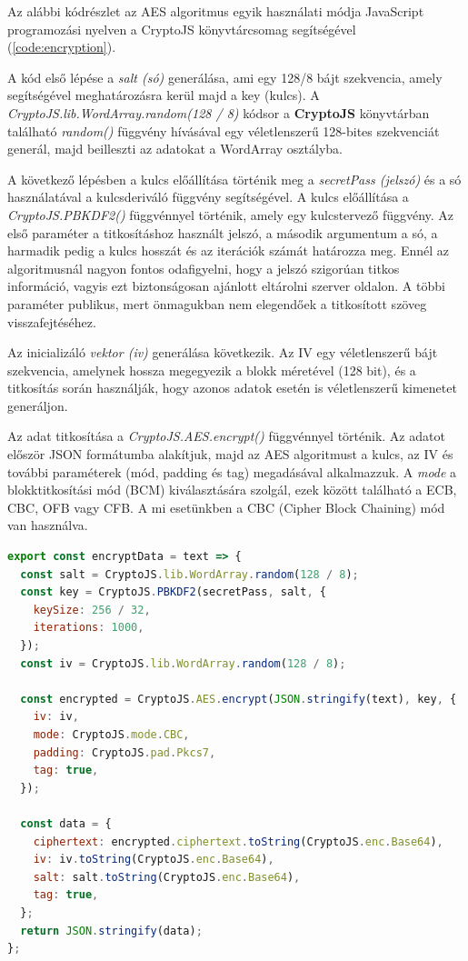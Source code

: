Az alábbi kódrészlet az AES algoritmus egyik használati módja JavaScript programozási nyelven a CryptoJS könyvtárcsomag segítségével (\ref{code:encryption}).

A kód első lépése a \textit{salt (só)} generálása, ami egy 128/8 bájt szekvencia, amely segítségével meghatározásra kerül majd a key (kulcs). A \textit{CryptoJS.lib.WordArray.random(128 / 8)} kódsor a \textbf{CryptoJS} könyvtárban található \textit{random()} függvény hívásával egy véletlenszerű 128-bites szekvenciát generál, majd beilleszti az adatokat a WordArray osztályba.

A következő lépésben a kulcs előállítása történik meg a \textit{secretPass (jelszó)} és a só használatával a kulcsderiváló függvény segítségével. A kulcs előállítása a \textit{CryptoJS.PBKDF2()} függvénnyel történik, amely egy kulcstervező függvény. Az első paraméter a titkosításhoz használt jelszó, a második argumentum a só, a harmadik pedig a kulcs hosszát és az iterációk számát határozza meg. Ennél az algoritmusnál nagyon fontos odafigyelni, hogy a jelszó szigorúan titkos információ, vagyis ezt biztonságosan ajánlott eltárolni szerver oldalon. A többi paraméter publikus, mert önmagukban nem elegendőek a titkosított szöveg visszafejtéséhez.

Az inicializáló \textit{vektor (iv)} generálása következik. Az IV egy véletlenszerű bájt szekvencia, amelynek hossza megegyezik a blokk méretével (128 bit), és a titkosítás során használják, hogy azonos adatok esetén is véletlenszerű kimenetet generáljon.

\pagebreak

Az adat titkosítása a \textit{CryptoJS.AES.encrypt()} függvénnyel történik. Az adatot először JSON formátumba alakítjuk, majd az AES algoritmust a kulcs, az IV és további paraméterek (mód, padding és tag) megadásával alkalmazzuk. A \textit{mode} a blokktitkosítási mód (BCM) kiválasztására szolgál, ezek között található a ECB, CBC, OFB vagy CFB. A mi esetünkben a CBC (Cipher Block Chaining) mód van használva.

\begin{lstlisting}[caption={Titkosítás példakód.}, captionpos=b, language = JavaScript, label={code:encryption}]
export const encryptData = text => {
  const salt = CryptoJS.lib.WordArray.random(128 / 8);
  const key = CryptoJS.PBKDF2(secretPass, salt, {
    keySize: 256 / 32,
    iterations: 1000,
  });
  const iv = CryptoJS.lib.WordArray.random(128 / 8);

  const encrypted = CryptoJS.AES.encrypt(JSON.stringify(text), key, {
    iv: iv,
    mode: CryptoJS.mode.CBC,
    padding: CryptoJS.pad.Pkcs7,
    tag: true,
  });

  const data = {
    ciphertext: encrypted.ciphertext.toString(CryptoJS.enc.Base64),
    iv: iv.toString(CryptoJS.enc.Base64),
    salt: salt.toString(CryptoJS.enc.Base64),
    tag: true,
  };
  return JSON.stringify(data);
};
\end{lstlisting}

